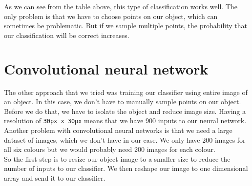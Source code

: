 \documentclass[12pt,a4paper]{article}
\begin{document}
	
	
	As we can see from the table above, this type of classification works well. The only problem is that we have to choose points on our object, which can sometimes be problematic. But if we sample multiple points, the probability that our classification will be correct increases.	
	
	\section{Convolutional neural network}
	
	The other approach that we tried was training our classifier using entire image of an object. In this case, we don't have to manually sample points on our object. Before we do that, we have to isolate the object and reduce image size. Having a resolution of \texttt{30px x 30px} means that we have 900 inputs to our neural network. Another problem with convolutional neural networks is that we need a large dataset of images, which we don't have in our case. We only have 200 images for all six colours but we would probably need 200 images for each colour. \\
	
	So the first step is to resize our object image to a smaller size to reduce the number of inputs to our classifier. We then reshape our image to one dimensional array and send it to our classifier.
	
	
	
\end{document}
